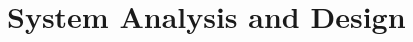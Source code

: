 \documentclass{llncs2e/llncs}
\begin{document}
%
%
%

\section{System Analysis and Design}

\end{document}
